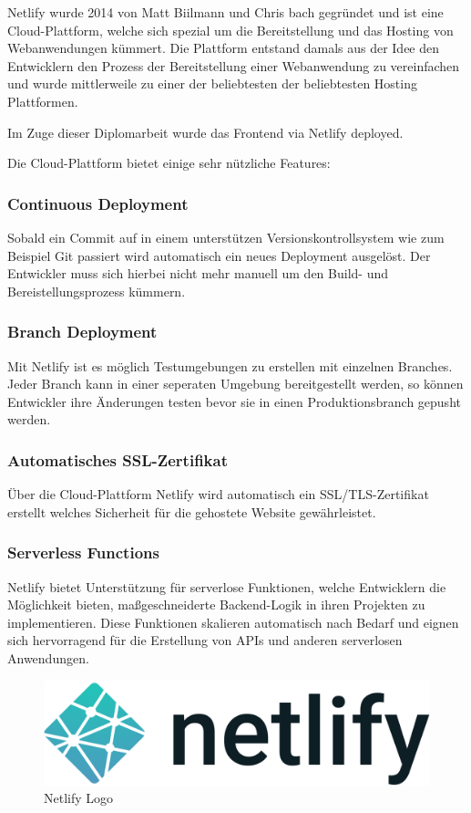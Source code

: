 
Netlify wurde 2014 von Matt Biilmann und Chris bach gegründet und ist eine Cloud-Plattform, welche sich spezial um die Bereitstellung und das Hosting von Webanwendungen kümmert. Die Plattform entstand damals aus der Idee den Entwicklern den Prozess der Bereitstellung einer Webanwendung zu vereinfachen und wurde mittlerweile zu einer der beliebtesten der beliebtesten Hosting Plattformen.
\cite{Netlify}

Im Zuge dieser Diplomarbeit wurde das Frontend via Netlify deployed.

Die Cloud-Plattform bietet einige sehr nützliche Features:

\subsubsection{Continuous Deployment}
Sobald ein Commit auf in einem unterstützen Versionskontrollsystem wie zum Beispiel Git passiert wird automatisch ein neues Deployment ausgelöst. Der Entwickler muss sich hierbei nicht mehr manuell um den Build- und Bereistellungsprozess kümmern.

\subsubsection{Branch Deployment}
Mit Netlify ist es möglich Testumgebungen zu erstellen mit einzelnen Branches. Jeder Branch kann in einer seperaten Umgebung bereitgestellt werden, so können Entwickler ihre Änderungen testen bevor sie in einen Produktionsbranch gepusht werden.

\subsubsection{Automatisches SSL-Zertifikat}
Über die Cloud-Plattform Netlify wird automatisch ein SSL/TLS-Zertifikat erstellt welches Sicherheit für die gehostete Website gewährleistet.

\subsubsection{Serverless Functions}
Netlify bietet Unterstützung für serverlose Funktionen, welche Entwicklern die Möglichkeit bieten, maßgeschneiderte Backend-Logik in ihren Projekten zu implementieren. Diese Funktionen skalieren automatisch nach Bedarf und eignen sich hervorragend für die Erstellung von APIs und anderen serverlosen Anwendungen.

\begin{figure}[h!]
    \centering
    \includegraphics[width=0.5\linewidth]{pics/netlify-logo.png}
    \caption{Netlify Logo}
    \label{fig:enter-label}
\end{figure}

\cite{Was_ist_Netlify}
